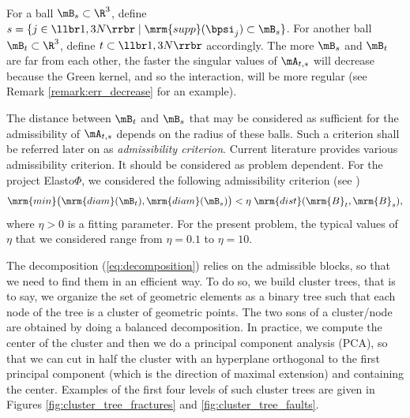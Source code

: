 \quad\\
For a ball $\mB_{s}\subset \R^{3}$, define $s = \{j \in\llbr 1,3N\rrbr\;\vert \;\mrm{supp}(\bpsi_{j})\subset \mB_{s}\}$. 
For another ball $\mB_{t}\subset \R^{3}$, define $t\subset \llbr1,3N\rrbr$ accordingly.  
The more $\mB_{s}$ and $\mB_{t}$ are far from each other, the faster the singular values of $\mA_{t,s}$ will decrease because the Green kernel, and so the interaction, will be more regular (see Remark \ref{remark:err_decrease} for an example).

The distance between $\mB_{t}$ and $\mB_{s}$ that may be considered as sufficient for the admissibility of $\mA_{t, s}$ depends on the radius of these balls. 
Such a criterion shall be referred later on as \textit{admissibility criterion}. Current literature provides various 
admissibility criterion. It should be considered as problem dependent. For the project Elasto$\Phi$, we considered the 
following admissibility criterion (see \cite{Rjasanow2007})
\begin{equation}\label{AdmissibilityCondition}
\mrm{min}\big( \mrm{diam}(\mB_{t}),\mrm{diam}(\mB_{s})\big)< \eta\;\mrm{dist}(\mrm{B}_{t},\mrm{B}_{s}),
\end{equation}
where $\eta>0$ is a fitting parameter. For the present problem, the typical values of $\eta$ that we considered  
range from $\eta = 0.1$ to $\eta = 10$. 

The decomposition (\ref{eq:decomposition}) relies on the admissible blocks, so that we need to find them in an efficient way. To do so, we build cluster trees, that is to say, we organize the set of geometric elements as a binary tree such that each node of the tree is a cluster of geometric points. The two sons of a cluster/node are obtained by doing a balanced decomposition. In practice, we compute the center of the cluster and then we do a principal component analysis (PCA), so that we can cut in half the cluster with an hyperplane orthogonal to the first principal component (which is the direction of maximal extension) and containing the center. Examples of the first four levels of such cluster trees are given in Figures \ref{fig:cluster_tree_fractures} and \ref{fig:cluster_tree_faults}.

